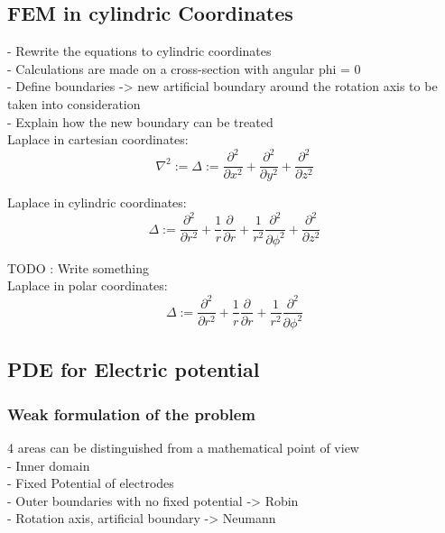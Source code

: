 \documentclass[parskip=half, titlepage=yes, 12pt, BCOR=12mm, DIV=calc]{scrartcl}
\begin{document}
\subsection{FEM in cylindric Coordinates}
- Rewrite the equations to cylindric coordinates \\
- Calculations are made on a cross-section with angular phi = 0 \\
- Define boundaries -> new artificial boundary around the rotation axis to be taken into consideration \\
- Explain how the new boundary can be treated \\
 
Laplace in cartesian coordinates:
\begin{equation}
    \nabla^2 := \Delta := \frac{\partial^2}{\partial x^2} + \frac{\partial^2}{\partial y^2} + \frac{\partial^2}{\partial z^2}
\end{equation}

Laplace in cylindric coordinates:
\begin{equation}
    \Delta := \frac{\partial^2}{\partial r^2} + \frac{1}{r} \frac{\partial}{\partial r} + \frac{1}{r^2} \frac{\partial^2}{\partial \phi^2} + \frac{\partial^2}{\partial z^2}
\end{equation}

TODO : Write something \\

Laplace in polar coordinates:
\begin{equation}
    \Delta := \frac{\partial^2}{\partial r^2} + \frac{1}{r} \frac{\partial}{\partial r} + \frac{1}{r^2} \frac{\partial^2}{\partial \phi^2}
\end{equation}



\subsection{PDE for Electric potential}

\subsubsection{Weak formulation of the problem}
4 areas can be distinguished from a mathematical point of view \\
- Inner domain \\
- Fixed Potential of electrodes \\
- Outer boundaries with no fixed potential -> Robin \\
- Rotation axis, artificial boundary -> Neumann \\
\end{document}
